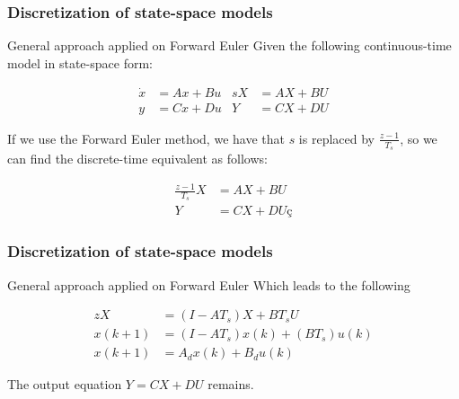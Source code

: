 \begin{frame}
	\frametitle{Discretization of state-space models}
	\begin{block}{General approach applied on Forward Euler}
		Given the following continuous-time model in state-space form:
		\vspace{-2em}
		\begin{center}
			\begin{align*}
			\dot{x} &= Ax + Bu  & sX &= AX + BU\\
			y &= Cx + Du & Y &= CX + DU
			\end{align*}
		\end{center}
		If we use the Forward Euler method, we have that $s$ is replaced by $\frac{z-1}{T_s}$, so we can find the discrete-time equivalent as follows:
		\vspace{-2em}
		\begin{center}
			\begin{align*}
			\frac{z-1}{T_s} X &= AX + BU\\
			Y &= CX + DUç
			\end{align*}
		\end{center}
	\end{block}
\end{frame}

\begin{frame}
	\frametitle{Discretization of state-space models}
	\begin{block}{General approach applied on Forward Euler}
		Which leads to the following
		\vspace{-2em}
		\begin{center}
			\begin{align*}
			zX &= (I - AT_s)X + BT_sU\\
			x(k+1) &= (I - AT_s)x(k) + (BT_s)u(k)\\
			x(k+1) &= A_d x(k) + B_d u(k)
			\end{align*}
		\end{center}
		The output equation $Y = CX + DU$ remains.
	\end{block}
\end{frame}

